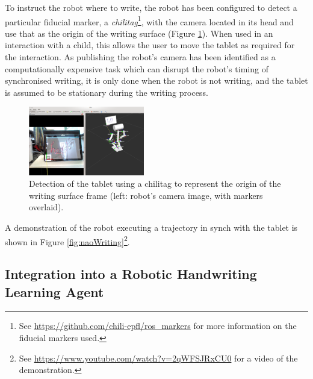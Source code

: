 \documentclass{sig-alternate}
\begin{document}
To instruct the robot where to write, the robot has been configured to detect a
particular fiducial marker, a \emph{chilitag}\footnote{See
\url{https://github.com/chili-epfl/ros_markers} for more information on the
fiducial markers used.}, with the camera located in its head and use that as the
origin of the writing surface (Figure \ref{fig:tabletDetection}). When used in
an interaction with a child, this allows the user to move the tablet as required
for the interaction. As publishing the robot's camera has been identified as a
computationally expensive task which can disrupt the robot's timing of
synchronised writing, it is only done when the robot is not writing, and the
tablet is assumed to be stationary during the writing process.

\begin{figure}[htpb]
    \centering
    \includegraphics[width=0.45\textwidth]{figures/chilitagDetection_cameraOverlay.png}
    \caption[Detection of the tablet using a chilitag to represent the origin of
    the writing surface frame.]{\label{fig:tabletDetection}Detection of the
    tablet using a chilitag to represent the origin of the writing surface frame
(left: robot's camera image, with markers overlaid).}

\end{figure}%
%
%


A demonstration of the robot executing a trajectory in synch with the tablet is
shown in Figure \ref{fig:naoWriting}\footnote{See
\url{https://www.youtube.com/watch?v=2qWFSJRxCU0} for a video of the
demonstration. }. %
%
%


\subsection{Integration into a Robotic Handwriting Learning Agent}
\end{document}
